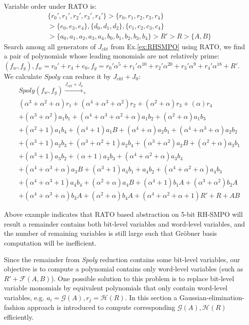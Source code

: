 \begin{Example}
\label{ex:newRATO}
Variable order under RATO is:
\begin{align}
&\{r_0',r_1',r_2',r_3',r_4'\}>\{r_0,r_1,r_2,r_3,r_4\}\nonumber\\
&>\{e_0,e_3,e_4\},\{d_0,d_1,d_2\},\{c_1,c_2,c_3,c_4\}\nonumber\\
&>\{a_0,a_1,a_2,a_3,a_4,b_0,b_1,b_2,b_3,b_4\}>R'>R>\{A,B\}\nonumber
\end{align}
Search among all generators of $J_{ckt}$ from Ex.\ref{ex:RHSMPO} using RATO, we find a pair of polynomials whose leading 
monomials are not relatively prime:
$(f_w,f_g), f_w = r_0'+r_4+e_0, f_g =r_0'\alpha^5+r_1'\alpha^{10}+r_2'\alpha^{20}+r_3'\alpha^9+r_4'\alpha^{18} + R'$.
We calculate $Spoly$ can reduce it by $J_{ckt}+J_0$:
\begin{align}
&Spoly(f_w,f_g) \xrightarrow{J_{ckt}+J_0}_{+}\nonumber\\
&(\alpha^3+\alpha^2+\alpha) r_1+(\alpha^4+\alpha^3+\alpha^2) r_2+(\alpha^2+\alpha) r_3+(\alpha) r_4\nonumber\\
&+(\alpha^3+\alpha^2) a_1 b_1+(\alpha^4+\alpha^3+\alpha^2+\alpha) a_1 b_2+(\alpha^2+\alpha) a_1 b_3\nonumber\\
&+(\alpha^2+1) a_1 b_4+(\alpha^4+1) a_1 B+(\alpha^4+\alpha) a_2 b_1+(\alpha^4+\alpha^3+\alpha) a_2 b_2\nonumber\\
&+(\alpha^3+1) a_2 b_3+(\alpha^3+\alpha^2+1) a_2 b_4+(\alpha^3+\alpha^2) a_2 B+(\alpha^2+\alpha) a_3 b_1\nonumber\\
&+(\alpha^3+1) a_3 b_2+(\alpha+1) a_3 b_3+(\alpha^4+\alpha^2+\alpha) a_3 b_4\nonumber\\
&+(\alpha^4+\alpha^3+\alpha) a_3 B+(\alpha^3+1) a_4 b_1+a_4 b_2+(\alpha^4+\alpha^2+\alpha) a_4 b_3\nonumber\\
&+(\alpha^4+\alpha^3+1) a_4 b_4+(\alpha^2+\alpha) a_4 B+(\alpha^4+1) b_1 A+(\alpha^3+\alpha^2) b_2 A\nonumber\\
&+(\alpha^4+\alpha^3+\alpha) b_3 A+(\alpha^2+\alpha) b_4 A+(\alpha^4+\alpha^2+\alpha+1) R'+R+A B\nonumber
\end{align}
\end{Example}
Above example indicates that RATO based abstraction on 5-bit RH-SMPO will result a remainder contains both
bit-level variables and word-level variables, and the number of remaining variables is still large such that
Gr\"obner basis computation will be inefficient.

Since the remainder from \emph{Spoly} reduction contains some bit-level variables, our objective is to compute
a polynomial contains only word-level variables (such as $R'+\mathcal{F}(A,B)$). One possible solution to
this problem is to replace bit-level variable monomials by equivalent polynomials that only contain word-level
variables, e.g. $a_i = \mathcal{G}(A), r_j = \mathcal{H}(R)$. In this section a Gaussian-elimination-fashion 
approach is introduced to compute corresponding $\mathcal{G}(A),\mathcal{H}(R)$ efficiently.


